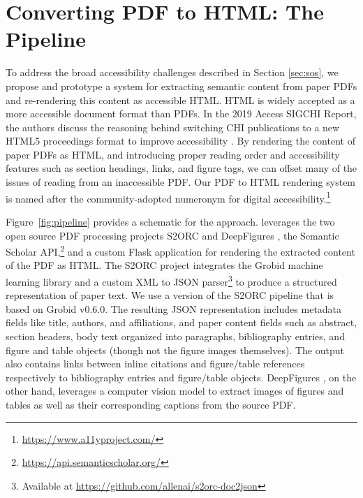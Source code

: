 \section{Converting PDF to HTML: The \scially Pipeline}
\label{sec:pdf2html}

To address the broad accessibility challenges described in Section \ref{sec:sos}, we propose and prototype a system for extracting semantic content from paper PDFs and re-rendering this content as accessible HTML. HTML is widely accepted as a more accessible document format than PDFs. In the 2019 Access SIGCHI Report, the authors discuss the reasoning behind switching CHI publications to a new HTML5 proceedings format to improve accessibility \citep{Mankoff2019SIGCHI}. 
By rendering the content of paper PDFs as HTML, and introducing proper reading order and accessibility features such as section headings, links, and figure tags, we can offset many of the issues of reading from an inaccessible PDF. Our PDF to HTML rendering system is named \scially after the community-adopted numeronym for digital accessibility.\footnote{\href{https://www.a11yproject.com/}{https://www.a11yproject.com/}} 

Figure~\ref{fig:pipeline} provides a schematic for the approach. \scially leverages the two open source PDF processing projects S2ORC \citep{lo-wang-2020-s2orc} and DeepFigures \citep{Siegel2018ExtractingSF}, the Semantic Scholar API,\footnote{\href{https://api.semanticscholar.org/}{https://api.semanticscholar.org/}} and a custom Flask application for rendering the extracted content of the PDF as HTML. The S2ORC project \citep{lo-wang-2020-s2orc} integrates the Grobid machine learning library \citep{Lopez2015GROBIDI} and a custom XML to JSON parser\footnote{Available at \href{https://github.com/allenai/s2orc-doc2json}{https://github.com/allenai/s2orc-doc2json}} to produce a structured representation of paper text. We use a version of the S2ORC pipeline that is based on Grobid v0.6.0. The resulting JSON representation includes metadata fields like title, authors, and affiliations, and paper content fields such as abstract, section headers, body text organized into paragraphs, bibliography entries, and figure and table objects (though not the figure images themselves). The output also contains links between inline citations and figure/table references respectively to bibliography entries and figure/table objects. DeepFigures \citep{Siegel2018ExtractingSF}, on the other hand, leverages a computer vision model to extract images of figures and tables as well as their corresponding captions from the source PDF. 

